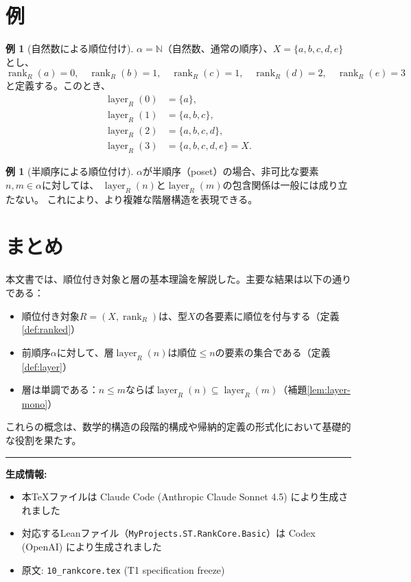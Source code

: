\documentclass[12pt,a4paper]{ltjsarticle}
\theoremstyle{definition}
\newtheorem{example}[definition]{例}
\begin{document}
\section{例}

\begin{example}[自然数による順位付け]
$\alpha = \mathbb{N}$（自然数、通常の順序）、$X = \{a, b, c, d, e\}$とし、
\[
  \operatorname{rank}_R(a) = 0, \quad
  \operatorname{rank}_R(b) = 1, \quad
  \operatorname{rank}_R(c) = 1, \quad
  \operatorname{rank}_R(d) = 2, \quad
  \operatorname{rank}_R(e) = 3
\]
と定義する。このとき、
\begin{align*}
  \operatorname{layer}_R(0) &= \{a\}, \\
  \operatorname{layer}_R(1) &= \{a, b, c\}, \\
  \operatorname{layer}_R(2) &= \{a, b, c, d\}, \\
  \operatorname{layer}_R(3) &= \{a, b, c, d, e\} = X.
\end{align*}
\end{example}

\begin{example}[半順序による順位付け]
$\alpha$が半順序（poset）の場合、非可比な要素$n, m \in \alpha$に対しては、
$\operatorname{layer}_R(n)$と$\operatorname{layer}_R(m)$の包含関係は一般には成り立たない。
これにより、より複雑な階層構造を表現できる。
\end{example}

\section{まとめ}

本文書では、順位付き対象と層の基本理論を解説した。主要な結果は以下の通りである：

\begin{itemize}[leftmargin=*]
  \item 順位付き対象$R = (X, \operatorname{rank}_R)$は、型$X$の各要素に順位を付与する（定義\ref{def:ranked}）
  \item 前順序$\alpha$に対して、層$\operatorname{layer}_R(n)$は順位$\le n$の要素の集合である（定義\ref{def:layer}）
  \item 層は単調である：$n \le m$ならば$\operatorname{layer}_R(n) \subseteq \operatorname{layer}_R(m)$（補題\ref{lem:layer-mono}）
\end{itemize}

これらの概念は、数学的構造の段階的構成や帰納的定義の形式化において基礎的な役割を果たす。

\vspace{1em}
\hrule
\vspace{0.5em}
\noindent
\textbf{生成情報:}
\begin{itemize}[leftmargin=*]
  \item 本TeXファイルは Claude Code (Anthropic Claude Sonnet 4.5) により生成されました
  \item 対応するLeanファイル（\texttt{MyProjects.ST.RankCore.Basic}）は Codex (OpenAI) により生成されました
  \item 原文: \texttt{10\_rankcore.tex} (T1 specification freeze)
\end{itemize}
\end{document}
